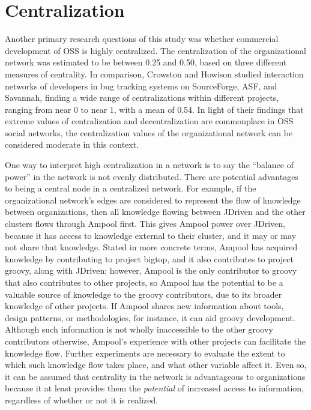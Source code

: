 \section{Centralization}
Another primary research questions of this study was whether commercial development of OSS is highly centralized. The centralization of the organizational network was estimated to be between 0.25 and 0.50, based on three different measures of centrality. In comparison, Crowston and Howison\cite{Crowston2006} studied interaction networks of developers in bug tracking systems on SourceForge, ASF, and Savannah, finding a wide range of centralizations within different projects, ranging from near 0 to near 1, with a mean of 0.54. In light of their findings that extreme values of centralization and decentralization are commonplace in OSS social networks, the centralization values of the organizational network can be considered moderate in this context.

One way to interpret high centralization in a network is to say the ``balance of power'' in the network is not evenly distributed. There are potential advantages to being a central node in a centralized network. For example, if the organizational network's edges are considered to represent the flow of knowledge between organizations, then all knowledge flowing between JDriven and the other clusters flows through Ampool first. This gives Ampool power over JDriven, because it has access to knowledge external to their cluster, and it may or may not share that knowledge. Stated in more concrete terms, Ampool has acquired knowledge by contributing to project bigtop, and it also contributes to project groovy, along with JDriven; however, Ampool is the only contributor to groovy that also contributes to other projects, so Ampool has the potential to be a valuable source of knowledge to the groovy contributors, due to its broader knowledge of other projects. If Ampool shares new information about tools, design patterns, or methodologies, for instance, it can aid groovy development. Although such information is not wholly inaccessible to the other groovy contributors otherwise, Ampool's experience with other projects can facilitate the knowledge flow. Further experiments are necessary to evaluate the extent to which such knowledge flow takes place, and what other variable affect it. Even so, it can be assumed that centrality in the network is advantageous to organizations because it at least provides them the \textit{potential} of increased access to information, regardless of whether or not it is realized.


